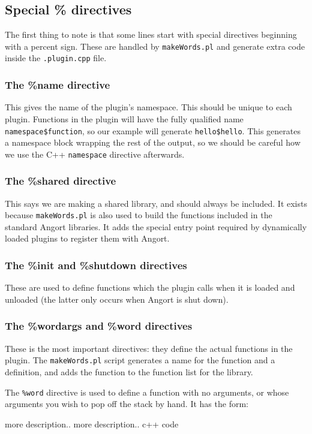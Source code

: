 \subsection{Special \% directives}
The first thing to note is that some lines start with special
directives beginning with a percent sign. These are handled by
\texttt{makeWords.pl} and generate extra code inside the \texttt{.plugin.cpp} file.

\subsubsection{The \%name directive}
This gives the name of the plugin's namespace. This should be unique
to each plugin. Functions in the plugin will have the fully qualified
name \verb+namespace$function+, so our example will generate
\verb+hello$hello+. This generates a namespace block wrapping the rest
of the output, so we should be careful how we use the C++
\texttt{namespace} directive afterwards.

\subsubsection{The \%shared directive}
This says we are making a shared library, and should always be included.
It exists because \texttt{makeWords.pl} is also used to build the functions
included in the standard Angort libraries. It adds the special entry
point required by dynamically loaded plugins to register them with
Angort.

\subsubsection{The \%init and \%shutdown directives}
These are used to define functions which the plugin calls when
it is loaded and unloaded (the latter only occurs when Angort is shut
down). 

\subsubsection{The \%wordargs and \%word directives}
These is the most important directives: they define the actual functions
in the plugin. The \texttt{makeWords.pl} script generates a name
for the function and a definition, and adds the function to the
function list for the library.

The \texttt{\%word} directive is used to define a function with no
arguments, or whose arguments you wish to pop off the stack by hand.
It has the form:
\begin{v}
more description..
more description..
{
    c++ code
}
\end{v}

